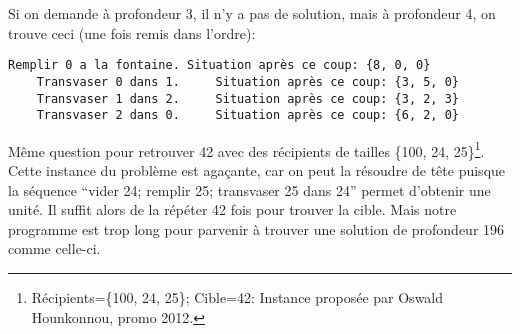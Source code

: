 \documentclass[10pt]{article}\usepackage[nu]{esial}%
\begin{document}
\begin{Reponse}
  Si on demande à profondeur 3, il n'y a pas de solution, mais à profondeur 4,
  on trouve ceci (une fois remis dans l'ordre):
  \begin{Verbatim}[gobble=4]
    Remplir 0 a la fontaine. Situation après ce coup: {8, 0, 0}    
    Transvaser 0 dans 1.     Situation après ce coup: {3, 5, 0}
    Transvaser 1 dans 2.     Situation après ce coup: {3, 2, 3}
    Transvaser 2 dans 0.     Situation après ce coup: {6, 2, 0}
  \end{Verbatim}
\end{Reponse}

\Question Même question pour retrouver 42 avec des récipients de tailles \{100,
24, 25\}\footnote{Récipients=\{100, 24, 25\}; Cible=42: Instance proposée par
  Oswald Hounkonnou, promo 2012.}. Cette instance du problème est agaçante, car
on peut la résoudre de tête puisque la séquence ``vider 24; remplir 25;
transvaser 25 dans 24'' permet d'obtenir une unité. Il suffit alors de la
répéter 42 fois pour trouver la cible. Mais notre programme est trop long pour
parvenir à trouver une solution de profondeur 196 comme celle-ci.
\end{document}
